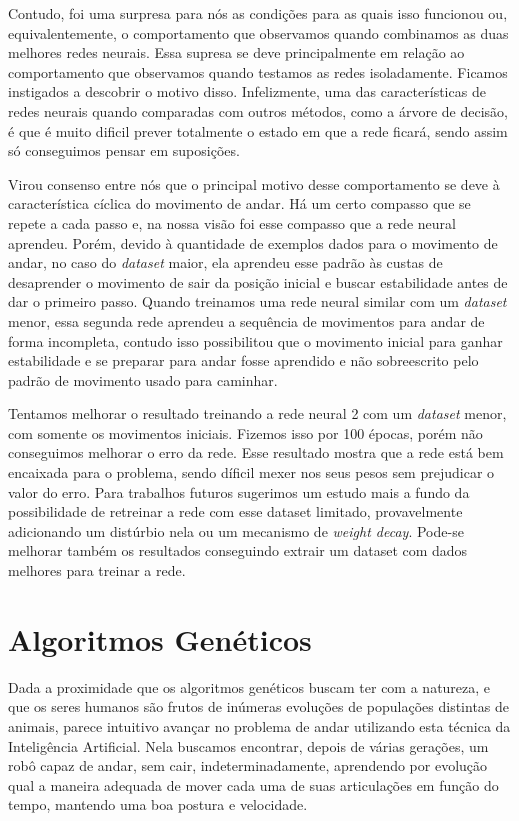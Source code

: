\documentclass[twoside,conference,a4paper]{IEEEtran}
\begin{document}
Contudo, foi uma surpresa para nós as condições para as quais isso funcionou ou, equivalentemente, o comportamento que observamos quando combinamos as duas melhores redes neurais. Essa supresa se deve principalmente em relação ao comportamento que observamos quando testamos as redes isoladamente. Ficamos instigados a descobrir o motivo disso. Infelizmente, uma das características de redes neurais quando comparadas com outros métodos, como a árvore de decisão, é que é muito dificil prever totalmente o estado em que a rede ficará, sendo assim só conseguimos pensar em suposições.

Virou consenso entre nós que o principal motivo desse comportamento se deve à característica cíclica do movimento de andar. Há um certo compasso que se repete a cada passo e, na nossa visão foi esse compasso que a rede neural aprendeu. Porém, devido à quantidade de exemplos dados para o movimento de andar, no caso do \textsl{dataset} maior, ela aprendeu esse padrão às custas de desaprender o movimento de sair da posição inicial e buscar estabilidade antes de dar o primeiro passo. Quando treinamos uma rede neural similar com um \textsl{dataset} menor, essa segunda rede aprendeu a sequência de movimentos para andar de forma incompleta, contudo isso possibilitou que o movimento inicial para ganhar estabilidade e se preparar para andar fosse aprendido e não sobreescrito pelo padrão de movimento usado para caminhar.

Tentamos melhorar o resultado treinando a rede neural 2 com um \textsl{dataset} menor, com somente os movimentos iniciais. Fizemos isso por 100 épocas, porém não conseguimos melhorar o erro da rede. Esse resultado mostra que a rede está bem encaixada para o problema, sendo díficil mexer nos seus pesos sem prejudicar o valor do erro. Para trabalhos futuros sugerimos um estudo mais a fundo da possibilidade de retreinar a rede com esse dataset limitado, provavelmente adicionando um distúrbio nela ou um mecanismo de \textsl{weight decay}\cite{hastie01statisticallearning}. Pode-se melhorar também os resultados conseguindo extrair um dataset com dados melhores para treinar a rede.


\section{Algoritmos Genéticos} \label{algoritmos_geneticos}

Dada a proximidade que os algoritmos genéticos buscam ter com a natureza, e que os seres humanos são frutos de inúmeras evoluções de populações distintas de animais, parece intuitivo avançar no problema de andar utilizando esta técnica da Inteligência Artificial. Nela buscamos encontrar, depois de várias gerações, um robô capaz de andar, sem cair, indeterminadamente, aprendendo por evolução qual a maneira adequada de mover cada uma de suas articulações em função do tempo, mantendo uma boa postura e velocidade.
\end{document}
